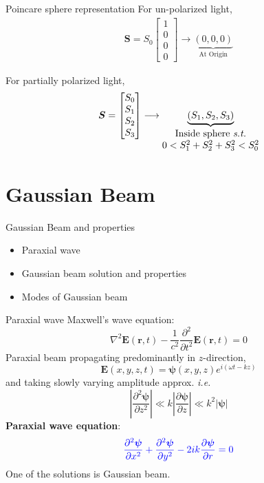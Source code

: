 \documentclass[12pt, dvipsnames]{beamer}
\numberwithin{equation}{section}
\begin{document}
\begin{frame}[t]{Poincare sphere representation}
For un-polarized light,
	\begin{align*}\boldsymbol{S}=
		S_0
		\begin{bmatrix}
			1\\
			0\\
			0\\
			0
		\end{bmatrix}\longrightarrow
		\underbrace{(0,0,0)}_{\text{At Origin}}
	\end{align*}\pause

For partially polarized light,
\begin{align*}\boldsymbol{S}=
	\begin{bmatrix}
		S_0\\
		S_1\\
		S_2\\
		S_3
	\end{bmatrix}\longrightarrow
	\underbrace{(S_1,S_2,S_3)}_{\begin{matrix}
			\text{Inside sphere \textit{s.t.}}\\
			0<S_1^2+S_2^2+S_3^2<S_0^2
		\end{matrix}}
\end{align*}

\end{frame}

\section{Gaussian Beam}

\begin{frame}
	\centering
	\alert{\huge Gaussian Beam and properties}
	\begin{itemize}\Large
		\item<1>Paraxial wave
		\item<0>Gaussian beam solution and properties
		\item<0>Modes of Gaussian beam
	\end{itemize}
\end{frame}

\begin{frame}{Paraxial wave}\vspace{-4pt}
	Maxwell's wave equation: 
	$$\nabla^2\boldsymbol{E}(\boldsymbol{r},t) - \frac{1}{c^2} \frac{\partial^2}{\partial t^2} \boldsymbol{E}(\boldsymbol{r},t)=0$$\pause
	Paraxial beam propagating predominantly in $z$-direction, $$\boldsymbol{E}(x,y,z,t)= \boldsymbol{\psi}(x,y,z) e^{i(\omega t-kz)}$$\pause
	and taking slowly varying amplitude approx. \textit{i.e.}  $$\left|\frac{\partial^2\boldsymbol{\psi}}{\partial z^2}\right|\ll k \left|\frac{\partial\boldsymbol{\psi}}{\partial z}\right| \ll
	k^2\left|\boldsymbol{\psi}\right|$$\pause
	\textbf{Paraxial wave equation}:
	$${\color{blue}\frac{\partial^2\boldsymbol{\psi}}{\partial x^2}+\frac{\partial^2\boldsymbol{\psi}}{\partial y^2} -2ik \frac{\partial\boldsymbol{\psi}}{\partial r}=0}$$\pause
	One of the solutions is \alert{\Large Gaussian beam}.\vspace{6pt}
\end{frame}
\end{document}
